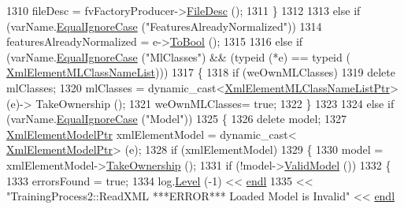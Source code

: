 \begin{DoxyCode}
1310           fileDesc = fvFactoryProducer->\hyperlink{class_k_k_m_l_l_1_1_factory_f_v_producer_ab2dea2e51cf9d6a109b52300619e185c}{FileDesc} ();
1311       \}
1312       
1313       \textcolor{keywordflow}{else} \textcolor{keywordflow}{if}  (varName.\hyperlink{class_k_k_b_1_1_k_k_str_a562f9696417c53f66bc4088eac072ab5}{EqualIgnoreCase} (\textcolor{stringliteral}{"FeaturesAlreadyNormalized"}))
1314         featuresAlreadyNormalized = e->\hyperlink{class_k_k_b_1_1_xml_element_a7bfbbea204722bc4535a294bc43e8e17}{ToBool} ();
1315 
1316       \textcolor{keywordflow}{else} \textcolor{keywordflow}{if}  (varName.\hyperlink{class_k_k_b_1_1_k_k_str_a562f9696417c53f66bc4088eac072ab5}{EqualIgnoreCase} (\textcolor{stringliteral}{"MlClasses"})  &&  (\textcolor{keyword}{typeid} (*e) == \textcolor{keyword}{typeid} (
      \hyperlink{class_k_k_m_l_l_1_1_xml_element_m_l_class_name_list}{XmlElementMLClassNameList})))
1317       \{
1318         \textcolor{keywordflow}{if}  (weOwnMLClasses)
1319           \textcolor{keyword}{delete}  mlClasses;
1320         mlClasses = \textcolor{keyword}{dynamic\_cast<}\hyperlink{class_k_k_m_l_l_1_1_xml_element_m_l_class_name_list}{XmlElementMLClassNameListPtr}\textcolor{keyword}{>} (e)->
      TakeOwnership ();
1321         weOwnMLClasses= \textcolor{keyword}{true};
1322       \}
1323 
1324       \textcolor{keywordflow}{else} \textcolor{keywordflow}{if}  (varName.\hyperlink{class_k_k_b_1_1_k_k_str_a562f9696417c53f66bc4088eac072ab5}{EqualIgnoreCase} (\textcolor{stringliteral}{"Model"}))
1325       \{
1326         \textcolor{keyword}{delete}  model;
1327         \hyperlink{class_k_k_m_l_l_1_1_xml_element_model}{XmlElementModelPtr}  xmlElementModel = \textcolor{keyword}{dynamic\_cast<}
      \hyperlink{class_k_k_m_l_l_1_1_xml_element_model}{XmlElementModelPtr}\textcolor{keyword}{>} (e);
1328         \textcolor{keywordflow}{if}  (xmlElementModel)
1329         \{
1330           model = xmlElementModel->\hyperlink{class_k_k_m_l_l_1_1_xml_element_model_afdfc907a83f08b5df048d54b634d09c5}{TakeOwnership} ();
1331           \textcolor{keywordflow}{if}  (!model->\hyperlink{class_k_k_m_l_l_1_1_model_aa9a1e4855c20e37b5245facd13276688}{ValidModel} ())
1332           \{
1333             errorsFound = \textcolor{keyword}{true};
1334             log.\hyperlink{class_k_k_b_1_1_run_log_a32cf761d7f2e747465fd80533fdbb659}{Level} (-1) << \hyperlink{namespace_k_k_b_ad1f50f65af6adc8fa9e6f62d007818a8}{endl}
1335               << \textcolor{stringliteral}{"TrainingProcess2::ReadXML   ***ERROR***    Loaded Model is Invalid"} << 
      \hyperlink{namespace_k_k_b_ad1f50f65af6adc8fa9e6f62d007818a8}{endl}

\end{DoxyCode}
